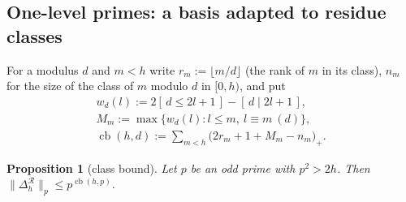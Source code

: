 \documentclass[11pt]{amsart}
\newtheorem{proposition}[theorem]{Proposition}
\theoremstyle{definition}
\theoremstyle{remark}
\numberwithin{equation}{section}
\newcommand{\cR}{\mathcal{R}}
\newcommand{\ind}[1]{[\,#1\,]}
\newcommand{\cb}{\operatorname{cb}}
\begin{document}
\subsection{One-level primes: a basis adapted to residue classes}\label{sec:classbound}
For a modulus $d$ and $m<h$ write $r_m:=\lfloor m/d\rfloor$ (the rank of $m$ in its class), $n_m$ for the size of the
class of $m$ modulo $d$ in $[0,h)$, and put
\begin{gather*}
  w_d(l):=2\ind{d\le2l+1}-\ind{d\mid2l+1},\\
  M_m:=\max\{w_d(l):l\le m,\ l\equiv m\ (d)\},\\
  \cb(h,d):=\sum_{m<h}\bigl(2r_m+1+M_m-n_m\bigr)_+ .
\end{gather*}

\begin{proposition}[class bound]\label{prop:classbound}
Let $p$ be an odd prime with $p^2>2h$. Then $\|\Delta^{\cR}_h\|_p\le p^{\cb(h,p)}$.
\end{proposition}
\end{document}
